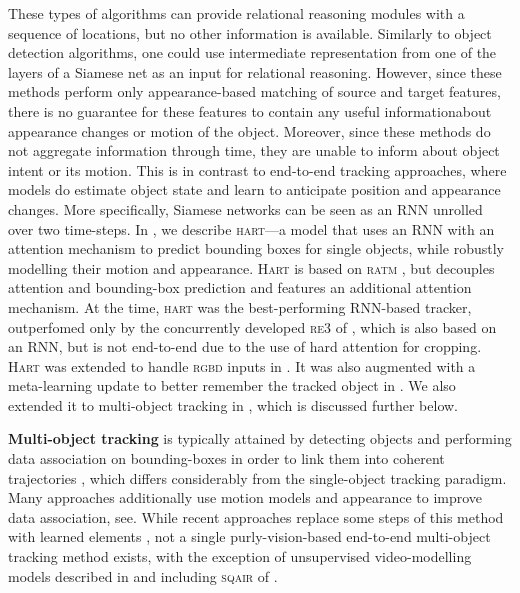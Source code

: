	These types of algorithms can provide relational reasoning modules with a sequence of locations, but no other information is available.
	Similarly to object detection algorithms, one could use intermediate representation from one of the layers of a Siamese net as an input for relational reasoning.
	However, since these methods perform only appearance-based matching of source and target features, there is no guarantee for these features to contain any useful information\eg about appearance changes or motion of the object.
	Moreover, since these methods do not aggregate information through time, they are unable to inform about object intent or its motion.
	This is in contrast to end-to-end tracking approaches, where models do estimate object state and learn to anticipate position and appearance changes.
	More specifically, Siamese networks can be seen as an \gls{RNN} unrolled over two time-steps.
	In , we describe \textsc{hart}---a model that uses an \gls{RNN} with an attention mechanism to predict bounding boxes for single objects, while robustly modelling their motion and appearance.
	\textsc{Hart} is based on \textsc{ratm} \citep{Kahou2015ratm}, but decouples attention and bounding-box prediction and features an additional attention mechanism.
	At the time, \textsc{hart} was the best-performing \gls{RNN}-based tracker, outperfomed only by the concurrently developed \textsc{re3} of \cite{Gordon2018re3}, which is also based on an \gls{RNN}, but is not end-to-end due to the use of hard attention for cropping.
	\textsc{Hart} was extended to handle \textsc{rgbd} inputs in \cite{Danesh2019deep}. 
	It was also augmented with a meta-learning update to better remember the tracked object in \cite{Li2019metahart}. We also extended it to multi-object tracking in , which is discussed further below.
	
%	
%
	\textbf{Multi-object tracking} is typically attained by detecting objects and performing data association on bounding-boxes in order to link them into coherent trajectories \citep{Zhang2008,Milan2014,Bae2017confidence,Keuper2018motion}, which differs considerably from the single-object tracking paradigm.
	Many approaches additionally use motion models and appearance to improve data association, see\eg \cite{Bewley2016sort}.
	While recent approaches replace some steps of this method with learned elements \citep{Schulter2017deepnf,Nam2016,Ning2017,Keuper2018motion,Bae2017confidence,Xiang2015},  not a single purly-vision-based end-to-end multi-object tracking method exists, with the exception of unsupervised video-modelling models described in  and including \textsc{sqair} of .
	

